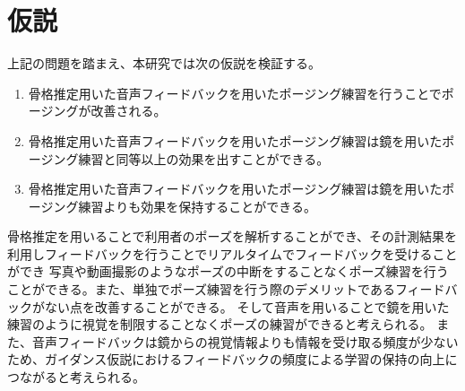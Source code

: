 \section{仮説}
上記の問題を踏まえ、本研究では次の仮説を検証する。
\begin{enumerate}
  \item 骨格推定用いた音声フィードバックを用いたポージング練習を行うことでポージングが改善される。
  \item 骨格推定用いた音声フィードバックを用いたポージング練習は鏡を用いたポージング練習と同等以上の効果を出すことができる。
  \item 骨格推定用いた音声フィードバックを用いたポージング練習は鏡を用いたポージング練習よりも効果を保持することができる。
\end{enumerate}
骨格推定を用いることで利用者のポーズを解析することができ、その計測結果を利用しフィードバックを行うことでリアルタイムでフィードバックを受けることができ
写真や動画撮影のようなポーズの中断をすることなくポーズ練習を行うことができる。また、単独でポーズ練習を行う際のデメリットであるフィードバックがない点を改善することができる。
そして音声を用いることで鏡を用いた練習のように視覚を制限することなくポーズの練習ができると考えられる。
また、音声フィードバックは鏡からの視覚情報よりも情報を受け取る頻度が少ないため、ガイダンス仮説におけるフィードバックの頻度による学習の保持の向上につながると考えられる。